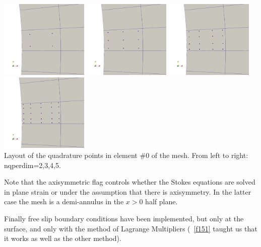 \begin{center}
\includegraphics[width=4.2cm]{python_codes/fieldstone_152/images/nq4}
\includegraphics[width=4.2cm]{python_codes/fieldstone_152/images/nq9}
\includegraphics[width=4.2cm]{python_codes/fieldstone_152/images/nq16}
\includegraphics[width=4.2cm]{python_codes/fieldstone_152/images/nq25}\\
{\captionfont Layout of the quadrature points in element \#0 of the mesh. 
From left to right: {\python nqperdim=2,3,4,5}.} 
\end{center}

Note that the {\python axisymmetric} flag controls whether the Stokes equations 
are solved in plane strain or under the assumption that there is axisymmetry. 
In the latter case the mesh is a demi-annulus in the $x>0$ half plane.

Finally free slip boundary conditions have been implemented, but only at the 
surface, and only with the method of Lagrange Multipliers (\stone~\ref{f151}
taught us that it works as well as the other method).  

